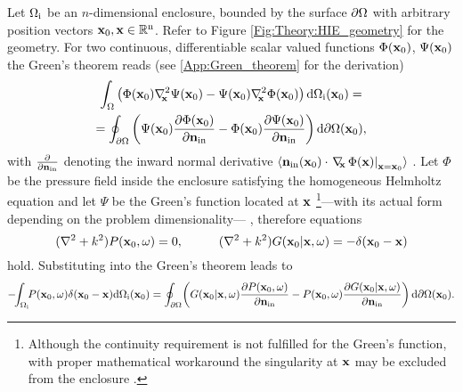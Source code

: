 Let $\Omega_{\mathrm{i}}$ be an $n$-dimensional enclosure, bounded by the surface $\partial \Omega$ with arbitrary position vectors $\mathbf{x}_0, \mathbf{x} \in \mathbb{R}^{\mathrm{n}}$. 
Refer to Figure \ref{Fig:Theory:HIE_geometry} for the geometry. 
For two continuous, differentiable scalar valued functions $\Phi(\mathbf{x}_0)$, $\Psi(\mathbf{x}_0)$ the Green's theorem reads (see \ref{App:Green_theorem} for the derivation)
\begin{multline}
\int_{\Omega}
\left(  \Phi(\mathbf{x}_0) \nabla^2_{\!\!\mathbf{x}} \Psi(\mathbf{x}_0) - \Psi(\mathbf{x}_0) \nabla^2_{\!\!\mathbf{x}} \Phi(\mathbf{x}_0)   \right)   \mathrm{d} \Omega_{\mathrm{i}}(\mathbf{x}_0)=  \\  =
\oint_{\partial \Omega}  \left(  \Psi(\mathbf{x}_0) \frac{\partial \Phi(\mathbf{x}_0)}{\partial \mathbf{n}_{\mathrm{in}}}  - \Phi(\mathbf{x}_0) \frac{\partial \Psi(\mathbf{x}_0)}{\partial \mathbf{n}_{\mathrm{in}}}  \right)   \mathrm{d} \partial \Omega(\mathbf{x}_0),
\label{Eq:Theory:Greens-theorem}
\end{multline}
with $\frac{\partial}{\partial \mathbf{n}_{\mathrm{in}}}$ denoting the inward normal derivative $\langle \mathbf{n}_{\mathrm{in}}(\mathbf{x}_0) \cdot \left. \nabla_{\!\!\mathbf{x}}\, \Phi(\mathbf{x})\right|_{\mathbf{x} = \mathbf{x}_0} \rangle$
.
Let $\Phi$ be the pressure field inside the enclosure satisfying the homogeneous Helmholtz equation and let $\Psi$ be the Green's function located at $\mathbf{x}$ \footnote{Although the continuity requirement is not fulfilled for the Green's function, with proper mathematical workaround the singularity at $\mathbf{x}$ may be excluded from the enclosure \cite{Williams1999}.}---with its actual form depending on the problem dimensionality---
, therefore equations
\begin{equation}
(\nabla^2 + k^2)P(\vxo,\omega) = 0, \hspace{10mm}
(\nabla^2 + k^2)G(\vxo|\vx,\omega) = -\delta(\vxo - \vx)
\end{equation}
hold.
Substituting into the Green's theorem leads to
\begin{equation}
\small
-\!\! \int_{\Omega_{\mathrm{i}}} \!\!P(\mathbf{x}_0,\omega) \delta(\mathbf{x}_0 - \mathbf{x})
  \mathrm{d} \Omega_{\mathrm{i}}(\mathbf{x}_0) = 
\oint_{\partial \Omega} \! \left( G(\mathbf{x}_0|\mathbf{x},\omega) \frac{\partial P(\mathbf{x}_0,\omega)}{\partial \mathbf{n}_{\mathrm{in}}}  - P(\mathbf{x}_0,\omega)  \frac{\partial G(\mathbf{x}_0|\mathbf{x},\omega)}{\partial \mathbf{n}_{\mathrm{in}}} \right) \mathrm{d} \partial \Omega(\mathbf{x}_0).
\end{equation}

